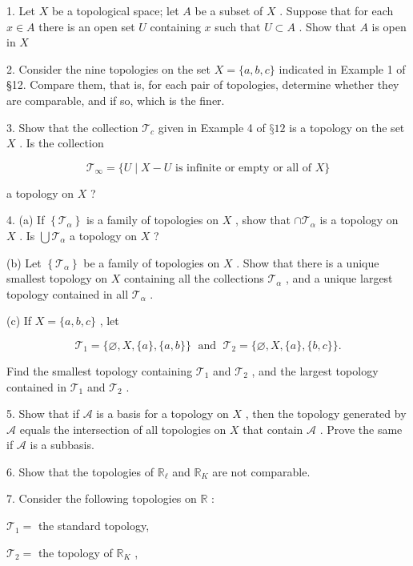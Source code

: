 1. Let \(X\) be a topological space; let \(A\) be a subset of \(X\) . Suppose that for each \(x \in  A\) there is an open set \(U\) containing \(x\) such that \(U \subset  A\) . Show that \(A\) is open in \(X\)

2. Consider the nine topologies on the set \(X = \{ a,b,c\}\) indicated in Example 1 of §12. Compare them, that is, for each pair of topologies, determine whether they are comparable, and if so, which is the finer.

3. Show that the collection \({\mathcal{T}}_{c}\) given in Example 4 of \(§{12}\) is a topology on the set \(X\) . Is the collection

\[
{\mathcal{T}}_{\infty } = \{ U \mid  X - U\text{ is infinite or empty or all of }X\}
\]

a topology on \(X\) ?

4. (a) If \(\left\{  {\mathcal{T}}_{\alpha }\right\}\) is a family of topologies on \(X\) , show that \(\cap  {\mathcal{T}}_{\alpha }\) is a topology on \(X\) . Is \(\bigcup {\mathcal{T}}_{\alpha }\) a topology on \(X\) ?

(b) Let \(\left\{  {\mathcal{T}}_{\alpha }\right\}\) be a family of topologies on \(X\) . Show that there is a unique smallest topology on \(X\) containing all the collections \({\mathcal{T}}_{\alpha }\) , and a unique largest topology contained in all \({\mathcal{T}}_{\alpha }\) .

(c) If \(X = \{ a,b,c\}\) , let

\[
{\mathcal{T}}_{1} = \{ \varnothing ,X,\{ a\} ,\{ a,b\} \} \;\text{ and }\;{\mathcal{T}}_{2} = \{ \varnothing ,X,\{ a\} ,\{ b,c\} \} .
\]

Find the smallest topology containing \({\mathcal{T}}_{1}\) and \({\mathcal{T}}_{2}\) , and the largest topology contained in \({\mathcal{T}}_{1}\) and \({\mathcal{T}}_{2}\) .

5. Show that if \(\mathcal{A}\) is a basis for a topology on \(X\) , then the topology generated by \(\mathcal{A}\) equals the intersection of all topologies on \(X\) that contain \(\mathcal{A}\) . Prove the same if \(\mathcal{A}\) is a subbasis.

6. Show that the topologies of \({\mathbb{R}}_{\ell }\) and \({\mathbb{R}}_{K}\) are not comparable.

7. Consider the following topologies on \(\mathbb{R}\) :

\({\mathcal{T}}_{1} =\) the standard topology,

\({\mathcal{T}}_{2} =\) the topology of \({\mathbb{R}}_{K}\) ,

